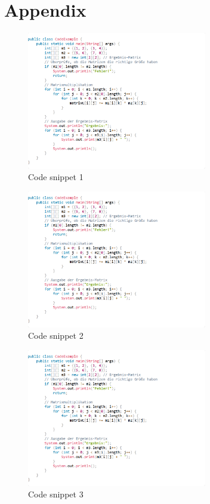 \chapter*{Appendix}

\begin{figure}[H]
    \centering
    \includegraphics[width=0.7\textwidth]{figures/codeb.png}
    \caption{Code snippet 1}
    \label{fig:appendix-example}
\end{figure}

\begin{figure}[H]
    \centering
    \includegraphics[width=0.7\textwidth]{figures/codeb.png}
    \caption{Code snippet 2}
    \label{fig:appendix-example}
\end{figure}

\begin{figure}[H]
    \centering
    \includegraphics[width=0.7\textwidth]{figures/codeb.png}
    \caption{Code snippet 3}
    \label{fig:appendix-example}
\end{figure}

